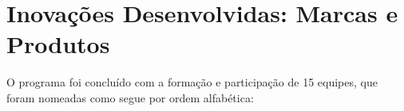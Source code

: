 






\section{Inovações Desenvolvidas: Marcas e Produtos}
\label{inovacoes}

O programa foi concluído  com a formação e participação de 15 equipes, que foram nomeadas como segue por ordem alfabética: 

